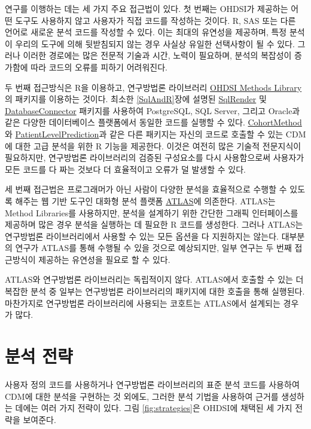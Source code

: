 \documentclass[10.5pt]{book}
\theoremstyle{definition}
\theoremstyle{definition}
\theoremstyle{definition}
\theoremstyle{remark}
\begin{document}
연구를 이행하는 데는 세 가지 주요 접근법이 있다. 첫 번째는 OHDSI가
제공하는 어떤 도구도 사용하지 않고 사용자가 직접 코드를 작성하는 것이다.
R, SAS 또는 다른 언어로 새로운 분석 코드를 작성할 수 있다. 이는 최대의
유연성을 제공하며, 특정 분석이 우리의 도구에 의해 뒷받침되지 않는 경우
사실상 유일한 선택사항이 될 수 있다. 그러나 이러한 경로에는 많은 전문적
기술과 시간, 노력이 필요하며, 분석의 복잡성이 증가함에 따라 코드의
오류를 피하기 어려워진다.

두 번째 접근방식은 R을 이용하고, 연구방법론 라이브러리
\href{https://ohdsi.github.io/MethodsLibrary/}{OHDSI Methods Library}의
패키지를 이용하는 것이다. 최소한 \ref{SqlAndR}장에 설명된
\href{https://ohdsi.github.io/SqlRender/}{SqlRender} 및
\href{https://ohdsi.github.io/DatabaseConnector/}{DatabaseConnector}
패키지를 사용하여 PostgreSQL, SQL Server, 그리고 Oracle과 같은 다양한
데이터베이스 플랫폼에서 동일한 코드를 실행할 수 있다.
\href{https://ohdsi.github.io/CohortMethod/}{CohortMethod}와
\href{https://ohdsi.github.io/PatientLevelPrediction/}{PatientLevelPrediction}과
같은 다른 패키지는 자신의 코드로 호출할 수 있는 CDM에 대한 고급 분석을
위한 R 기능을 제공한다. 이것은 여전히 많은 기술적 전문지식이 필요하지만,
연구방법론 라이브러리의 검증된 구성요소를 다시 사용함으로써 사용자가
모든 코드를 다 짜는 것보다 더 효율적이고 오류가 덜 발생할 수 있다.

세 번째 접근법은 프로그래머가 아닌 사람이 다양한 분석을 효율적으로
수행할 수 있도록 해주는 웹 기반 도구인 대화형 분석 플랫폼
\href{https://github.com/OHDSI/Atlas/wiki}{ATLAS}에 의존한다. ATLAS는
Method Libraries를 사용하지만, 분석을 설계하기 위한 간단한 그래픽
인터페이스를 제공하며 많은 경우 분석을 실행하는 데 필요한 R 코드를
생성한다. 그러나 ATLAS는 연구방법론 라이브러리에서 사용할 수 있는 모든
옵션을 다 지원하지는 않는다. 대부분의 연구가 ATLAS를 통해 수행될 수 있을
것으로 예상되지만, 일부 연구는 두 번째 접근방식이 제공하는 유연성을
필요로 할 수 있다.

ATLAS와 연구방법론 라이브러리는 독립적이지 않다. ATLAS에서 호출할 수
있는 더 복잡한 분석 중 일부는 연구방법론 라이브러리의 패키지에 대한
호출을 통해 실행된다. 마찬가지로 연구방법론 라이브러리에 사용되는
코호트는 ATLAS에서 설계되는 경우가 많다.

\section{분석 전략}\label{-}

사용자 정의 코드를 사용하거나 연구방법론 라이브러리의 표준 분석 코드를
사용하여 CDM에 대한 분석을 구현하는 것 외에도, 그러한 분석 기법을
사용하여 근거를 생성하는 데에는 여러 가지 전략이 있다. 그림
\ref{fig:strategies}은 OHDSI에 채택된 세 가지 전략을 보여준다.
\end{document}
